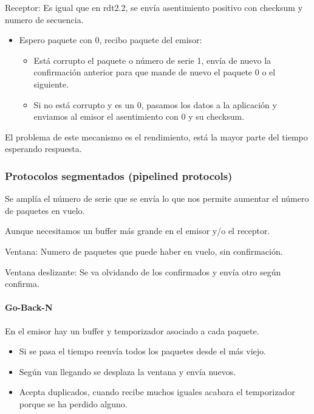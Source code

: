 \documentclass[12pt, twoside, openright]{report} %
\begin{document}
\begin{figure}[H]
	{\def\svgwidth{1.2\textwidth}
		}
\end{figure}

Receptor: Es igual que en rdt2.2, se envía asentimiento positivo
con checksum y numero de secuencia.

\begin{itemize}
	\item Espero paquete con 0, recibo paquete del emisor:

	      \begin{itemize}
		      \item Está corrupto el paquete o número de serie 1, envía de nuevo
		            la confirmación anterior para que mande de nuevo el paquete 0
		            o el siguiente.
		      \item Si no está corrupto y es un 0, pasamos los datos a la
		            aplicación y enviamos al emisor el asentimiento con 0 y su
		            checksum.
	      \end{itemize}
\end{itemize}

El problema de este mecanismo es el rendimiento, está la mayor
parte del tiempo esperando respuesta.


\subsubsection{Protocolos segmentados (pipelined protocols)}
Se amplía el número de serie que se envía lo que nos permite
aumentar el número de paquetes en vuelo.

Aunque necesitamos un buffer más grande en el emisor y/o el
receptor.

Ventana: Numero de paquetes que puede haber en vuelo, sin
confirmación.

Ventana deslizante: Se va olvidando de los confirmados y envía
otro según confirma.

\paragraph{Go-Back-N}



En el emisor hay un buffer y temporizador asociado a cada
paquete.

\begin{itemize}
	\item Si se pasa el tiempo reenvía todos los paquetes desde el más
	      viejo.
	\item Según van llegando se desplaza la ventana y envía nuevos.
	\item Acepta duplicados, cuando recibe muchos iguales acabara el
	      temporizador porque se ha perdido alguno.
\end{itemize}
\end{document}
